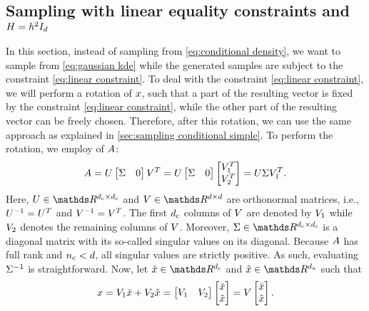 \subsection{Sampling with linear equality constraints and $H=h^2I_{d}$}
\label{sec:sampling constrained simple}

In this section, instead of sampling from \cref{eq:conditional density}, we want to sample from \cref{eq:gaussian kde} while the generated samples are subject to the constraint \cref{eq:linear constraint}.
To deal with the constraint \cref{eq:linear constraint}, we will perform a rotation of $x$, such that a part of the resulting vector is fixed by the constraint \cref{eq:linear constraint}, while the other part of the resulting vector can be freely chosen.
Therefore, after this rotation, we can use the same approach as explained in \cref{sec:sampling conditional simple}.
To perform the rotation, we employ  \autocite{golub2013matrix} of $A$:
\begin{equation}
	\label{eq:svd constraint matrix}
	A 
	= U \begin{bmatrix} \Sigma & 0 \end{bmatrix} V^T
	= U
	\begin{bmatrix} \Sigma & 0 \end{bmatrix}
	\begin{bmatrix} V_1^T \\ V_2^T \end{bmatrix}
	= U \Sigma V_1^T.
\end{equation}
Here, $\svdu \in \realnumbers^{\dimensionparta \times \dimensionparta}$ and $\svdv \in \realnumbers^{\dimension \times \dimension}$ are orthonormal matrices, i.e., $U^{-1} = U^T$ and $V^{-1} = V^T$.
The first $d_\mathrm{c}$ columns of $V$ are denoted by $V_1$ while $V_2$ denotes the remaining columns of $V$.
Moreover, $\svds \in \realnumbers^{\dimensionparta \times \dimensionparta}$ is a diagonal matrix with its so-called singular values on its diagonal.
Because $A$ has full rank and $n_\mathrm{c}<d$, all singular values are strictly positive.
As such, evaluating $\Sigma^{-1}$ is straightforward.
Now, let $\variableconstrained \in \realnumbers^{\dimensionparta}$ and $\variableunconstrained \in \realnumbers^{\dimensionpartb}$ such that
\begin{equation}
	\label{eq:rotation variable}
	x = V_1 \breve{x} + V_2 \tilde{x} 
	= \begin{bmatrix} V_1 & V_2 \end{bmatrix} \begin{bmatrix} \breve{x} \\ \tilde{x} \end{bmatrix}
	= V \begin{bmatrix} \breve{x} \\ \tilde{x} \end{bmatrix}.
\end{equation}
